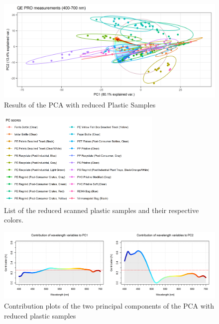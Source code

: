 \begin{figure}[H]
    \centering
    \includegraphics[width=1\textwidth]{Images/results/PCA_plastics_reduced_only_scat.png}
    \caption{Results of the PCA with reduced Plastic Samples}
    \label{fig:PCA_plastics_reduced_only_scat}
\end{figure}

\begin{figure}[H]
    \centering
    \includegraphics[width=0.7\textwidth]{Images/results/PCA_plastics_reduced_list.png}
    \caption{List of the reduced scanned plastic samples and their respective colors.}
    \label{fig:PCA_plastics_reduced_list}
\end{figure}

\begin{figure}[H]
    \centering
    \includegraphics[width=1\textwidth]{Images/results/PCA_plastics_reduced_doub_cont.png}
    \caption{Contribution plots of the two principal components of the PCA with reduced plastic samples}
    \label{fig:PCA_plastics_doub_cont}
\end{figure}

